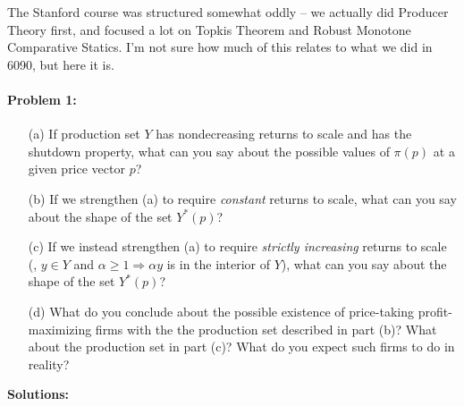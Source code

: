 \documentclass[12pt]{article}
\begin{document}
\begin{remark}
	The Stanford course was structured somewhat oddly -- we actually did Producer Theory first, and focused a lot on Topkis Theorem and Robust Monotone Comparative Statics. I'm not sure how much of this relates to what we did in 6090, but here it is.
\end{remark}

\paragraph{Problem 1:} 

\begin{itemize}
    \item[(a)] If production set $Y$ has nondecreasing returns to scale and has the shutdown property, what can you say about the possible values of $\pi(p)$ at a given price vector $p$?

    \item[(b)] If we strengthen (a) to require \emph{constant} returns to scale, what can you say about the shape of the set $Y^*(p)$?

    \item[(c)] If we instead strengthen (a) to require \emph{strictly increasing} returns to scale (\ie, $y \in Y$ and $\alpha \ge 1 \Rightarrow \alpha y$ is in the interior of $Y$), what can you say about the shape of the set $Y^*(p)$?

    \item[(d)] What do you conclude about the possible existence of price-taking profit-maximizing firms with the the production set described in part (b)? What about the production set in part (c)? What do you expect such firms to do in reality?
\end{itemize}

\medskip

\textbf{Solutions:}
\end{document}
